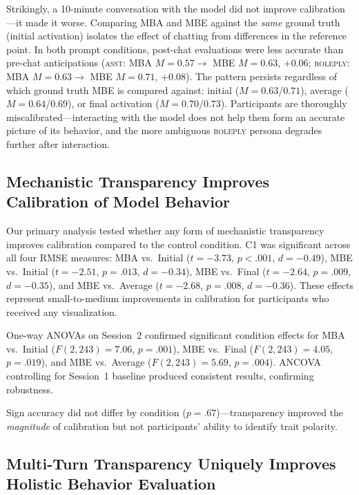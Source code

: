 Strikingly, a 10-minute conversation with the model did not improve
calibration---it made it worse. Comparing MBA and MBE against the
\emph{same} ground truth (initial activation) isolates the effect of
chatting from differences in the reference point. In both prompt
conditions, post-chat evaluations were less accurate than pre-chat
anticipations (\textsc{asst}: MBA $M = 0.57 \rightarrow$ MBE $M = 0.63$,
$+0.06$; \textsc{roleply}: MBA $M = 0.63 \rightarrow$ MBE $M = 0.71$,
$+0.08$). The pattern persists regardless of which ground truth MBE is
compared against: initial ($M = 0.63$/$0.71$), average
($M = 0.64$/$0.69$), or final activation ($M = 0.70$/$0.73$).
Participants are thoroughly miscalibrated---interacting with the model
does not help them form an accurate picture of its behavior, and the
more ambiguous \textsc{roleply} persona degrades further after
interaction.

\subsection{Mechanistic Transparency Improves Calibration of Model
Behavior}

Our primary analysis tested whether any form of mechanistic
transparency improves calibration compared to the control condition.
C1 was significant across all four RMSE measures: MBA vs.\ Initial
($t = -3.73$, $p < .001$, $d = -0.49$), MBE vs.\ Initial ($t = -2.51$,
$p = .013$, $d = -0.34$), MBE vs.\ Final ($t = -2.64$, $p = .009$,
$d = -0.35$), and MBE vs.\ Average ($t = -2.68$, $p = .008$,
$d = -0.36$). These effects represent small-to-medium improvements in
calibration for participants who received any visualization.

One-way ANOVAs on Session~2 confirmed significant condition effects for
MBA vs.\ Initial ($F(2,243) = 7.06$, $p = .001$), MBE vs.\ Final
($F(2,243) = 4.05$, $p = .019$), and MBE vs.\ Average
($F(2,243) = 5.69$, $p = .004$). ANCOVA controlling for Session~1
baseline produced consistent results, confirming robustness.

Sign accuracy did not differ by condition ($p = .67$)---transparency
improved the \emph{magnitude} of calibration but not participants'
ability to identify trait polarity.

\subsection{Multi-Turn Transparency Uniquely Improves Holistic Behavior
Evaluation}


